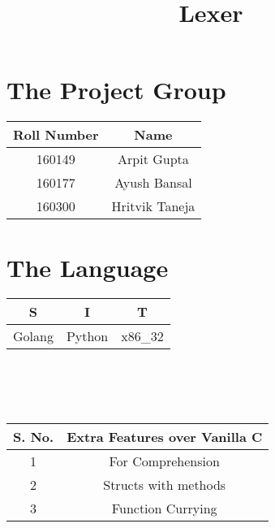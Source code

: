\documentclass{article}
\title{Lexer}
\author{}
\date{}
\begin{document}
\maketitle

\section{The Project Group}
\begin{tabular}{|c|c|}
\hline
Roll Number & Name \\\hline
160149     &  Arpit Gupta\\\hline
160177     &  Ayush Bansal\\\hline
160300     &  Hritvik Taneja\\\hline
\end{tabular}

\section{The Language}
\begin{tabular}{|c|c|c|}
\hline
S & I & T \\\hline
Golang & Python & x86\_32 \\\hline
\end{tabular}\\\\\\
\begin{tabular}{|c|c|}
\hline
S. No. & Extra Features over Vanilla C\\\hline
1 & For Comprehension \\\hline
2 & Structs with methods \\\hline
3 & Function Currying \\\hline
\end{tabular}
\end{document}
